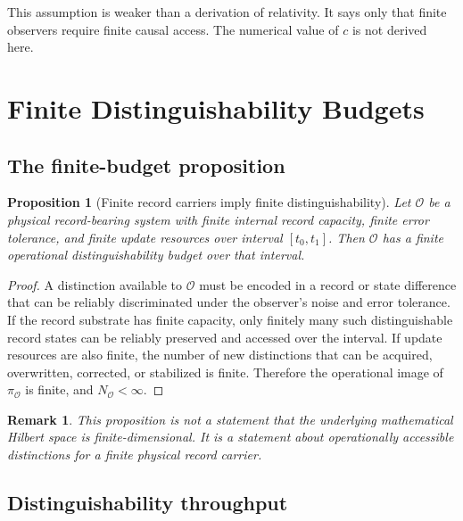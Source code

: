 \documentclass[10pt,a4paper,twocolumn,aps,prl]{revtex4-2}
\newtheorem{proposition}{Proposition}
\newtheorem{remark}{Remark}
\newcommand{\Obs}{\mathcal{O}}
\newcommand{\NA}{N_{\Obs}}
\begin{document}
This assumption is weaker than a derivation of relativity. It says only that finite observers require finite causal access. The numerical value of $c$ is not derived here.

\section{Finite Distinguishability Budgets}

\subsection{The finite-budget proposition}

\begin{proposition}[Finite record carriers imply finite distinguishability]
Let $\Obs$ be a physical record-bearing system with finite internal record capacity, finite error tolerance, and finite update resources over interval $[t_0,t_1]$. Then $\Obs$ has a finite operational distinguishability budget over that interval.
\end{proposition}

\begin{proof}
A distinction available to $\Obs$ must be encoded in a record or state difference that can be reliably discriminated under the observer's noise and error tolerance. If the record substrate has finite capacity, only finitely many such distinguishable record states can be reliably preserved and accessed over the interval. If update resources are also finite, the number of new distinctions that can be acquired, overwritten, corrected, or stabilized is finite. Therefore the operational image of $\pi_{\Obs}$ is finite, and $\NA<\infty$.
\end{proof}

\begin{remark}
This proposition is not a statement that the underlying mathematical Hilbert space is finite-dimensional. It is a statement about operationally accessible distinctions for a finite physical record carrier.
\end{remark}

\subsection{Distinguishability throughput}
\end{document}
